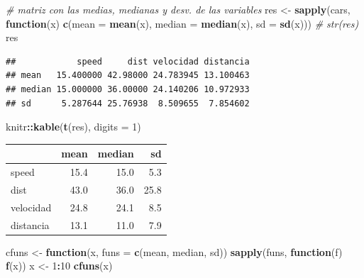 \documentclass[]{book}
\newenvironment{Shaded}{\begin{snugshade}}{\end{snugshade}}
\newcommand{\KeywordTok}[1]{\textcolor[rgb]{0.13,0.29,0.53}{\textbf{#1}}}
\newcommand{\DataTypeTok}[1]{\textcolor[rgb]{0.13,0.29,0.53}{#1}}
\newcommand{\DecValTok}[1]{\textcolor[rgb]{0.00,0.00,0.81}{#1}}
\newcommand{\StringTok}[1]{\textcolor[rgb]{0.31,0.60,0.02}{#1}}
\newcommand{\CommentTok}[1]{\textcolor[rgb]{0.56,0.35,0.01}{\textit{#1}}}
\newcommand{\ControlFlowTok}[1]{\textcolor[rgb]{0.13,0.29,0.53}{\textbf{#1}}}
\newcommand{\OperatorTok}[1]{\textcolor[rgb]{0.81,0.36,0.00}{\textbf{#1}}}
\newcommand{\NormalTok}[1]{#1}
\begin{document}
\begin{Shaded}
\begin{Highlighting}[]
\CommentTok{# matriz con las medias, medianas y desv. de las variables}
\NormalTok{res <-}\StringTok{ }\KeywordTok{sapply}\NormalTok{(cars, }
          \ControlFlowTok{function}\NormalTok{(x) }\KeywordTok{c}\NormalTok{(}\DataTypeTok{mean =} \KeywordTok{mean}\NormalTok{(x), }\DataTypeTok{median =} \KeywordTok{median}\NormalTok{(x), }\DataTypeTok{sd =} \KeywordTok{sd}\NormalTok{(x)))}
\CommentTok{# str(res)}
\NormalTok{res}
\end{Highlighting}
\end{Shaded}

\begin{verbatim}
##            speed     dist velocidad distancia
## mean   15.400000 42.98000 24.783945 13.100463
## median 15.000000 36.00000 24.140206 10.972933
## sd      5.287644 25.76938  8.509655  7.854602
\end{verbatim}

\begin{Shaded}
\begin{Highlighting}[]
\NormalTok{knitr}\OperatorTok{::}\KeywordTok{kable}\NormalTok{(}\KeywordTok{t}\NormalTok{(res), }\DataTypeTok{digits =} \DecValTok{1}\NormalTok{)}
\end{Highlighting}
\end{Shaded}

\begin{tabular}{l|r|r|r}
\hline
  & mean & median & sd\\
\hline
speed & 15.4 & 15.0 & 5.3\\
\hline
dist & 43.0 & 36.0 & 25.8\\
\hline
velocidad & 24.8 & 24.1 & 8.5\\
\hline
distancia & 13.1 & 11.0 & 7.9\\
\hline
\end{tabular}

\begin{Shaded}
\begin{Highlighting}[]
\NormalTok{cfuns <-}\StringTok{ }\ControlFlowTok{function}\NormalTok{(x, }\DataTypeTok{funs =} \KeywordTok{c}\NormalTok{(mean, median, sd))}
            \KeywordTok{sapply}\NormalTok{(funs, }\ControlFlowTok{function}\NormalTok{(f) }\KeywordTok{f}\NormalTok{(x))}
\NormalTok{x <-}\StringTok{ }\DecValTok{1}\OperatorTok{:}\DecValTok{10}
\KeywordTok{cfuns}\NormalTok{(x)}
\end{Highlighting}
\end{Shaded}
\end{document}
